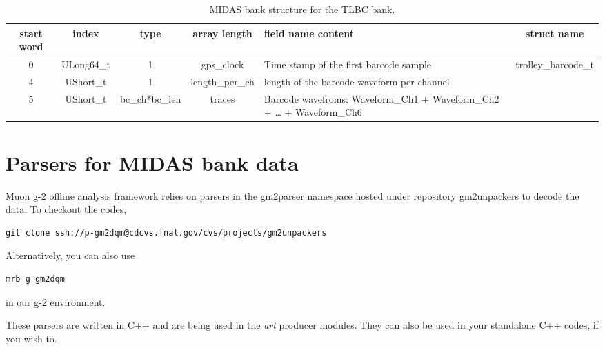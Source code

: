 \begin{table}[htbp]
\centering
\caption{MIDAS bank structure for the TLBC bank.}
\begin{tabular}{|c|c|c|c|p{4cm}|c|}
\hline
start word & index & type & array length & field name	content & struct name \\ 
\hline
0 & ULong64\_t & 1 & gps\_clock & Time stamp of the first barcode sample & \multirow{3}{*}{trolley\_barcode\_t} \\
\cline{1-5}
4 & UShort\_t & 1 & length\_per\_ch & length of the barcode waveform per channel & \\ 
\cline{1-5}	
5 & UShort\_t	& bc\_ch*bc\_len & traces &	Barcode wavefroms: Waveform\_Ch1 + Waveform\_Ch2 + … + Waveform\_Ch6	 &\\
\hline
\end{tabular} 
\label{tab:tlbc}
\end{table}

\newpage
\section{Parsers for MIDAS bank data}
Muon g-2 offline analysis framework relies on parsers in the gm2parser namespace hosted under repository gm2unpackers to decode the data. To checkout the codes, 

\begin{Verbatim}[frame=single]
git clone ssh://p-gm2dqm@cdcvs.fnal.gov/cvs/projects/gm2unpackers
\end{Verbatim}
%
Alternatively, you can also use 
\begin{Verbatim}[frame=single]
mrb g gm2dqm
\end{Verbatim}
in our g-2 environment.

These parsers are written in C++ and are being used in the \textit{art} producer modules. They can also be used in your standalone C++ codes, if you wish to.


